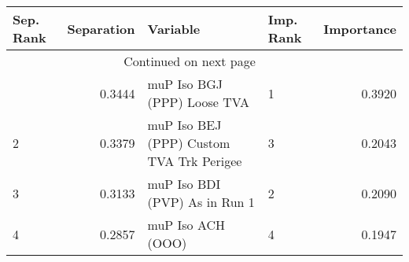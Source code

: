 \usepackage{lscape}

\begin{landscape}
\begin{longtable}{lrllr}
\toprule
Sep. Rank &  Separation &                                  Variable & Imp. Rank &  Importance \\
\midrule
\endhead
\midrule
\multicolumn{3}{r}{{Continued on next page}} \\
\midrule
\endfoot

\bottomrule
\endlastfoot
        1 &      0.3444 &               muP Iso BGJ (PPP) Loose TVA &         1 &      0.3920 \\
        2 &      0.3379 &  muP Iso BEJ (PPP) Custom TVA Trk Perigee &         3 &      0.2043 \\
        3 &      0.3133 &             muP Iso BDI (PVP) As in Run 1 &         2 &      0.2090 \\
        4 &      0.2857 &                         muP Iso ACH (OOO) &         4 &      0.1947 \\
\end{longtable}

\end{landscape}
